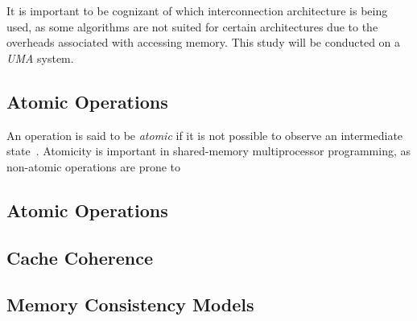 It is important to be cognizant of which interconnection architecture is being
used, as some algorithms are not suited for certain architectures due to the
overheads associated with accessing memory. This study will be
conducted on a \emph{UMA} system.

\subsection{Atomic Operations}
An operation is said to be \emph{atomic} if it is not possible to observe an
intermediate state~\cite{perfbook2021}. Atomicity is
important in shared-memory multiprocessor programming, as non-atomic operations
are prone to 




\subsection{Atomic Operations}

\subsection{Cache Coherence}

\subsection{Memory Consistency Models}

